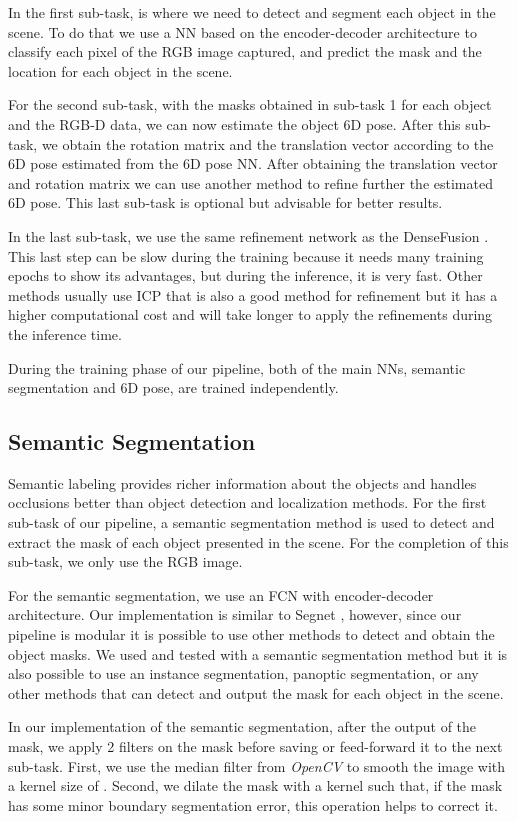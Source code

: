 \documentclass[runningheads]{llncs}
\begin{document}
In the first sub-task, is where we need to detect and segment each object in the scene. To do that we use a NN based on the encoder-decoder architecture to classify each pixel of the RGB image captured, and predict the mask and the location for each object in the scene.

For the second sub-task, with the masks obtained in sub-task 1 for each object and the RGB-D data, we can now estimate the object 6D pose.
After this sub-task, we obtain the rotation matrix and the translation vector according to the 6D pose estimated from the 6D pose NN.
After obtaining the translation vector and rotation matrix we can use another method to refine further the estimated 6D pose.
This last sub-task is optional but advisable for better results.

In the last sub-task, we use the same refinement network as the DenseFusion \cite{densefusion}.
This last step can be slow during the training because it needs many training epochs to show its advantages, but during the inference, it is very fast.
Other methods usually use ICP that is also a good method for refinement but it has a higher computational cost and will take longer to apply the refinements during the inference time.

During the training phase of our pipeline, both of the main NNs, semantic segmentation and 6D pose, are trained independently.

\subsection{Semantic Segmentation}
Semantic labeling provides richer information about the objects and handles occlusions better than object detection and localization methods.
For the first sub-task of our pipeline, a semantic segmentation method is used to detect and extract the mask of each object presented in the scene.
For the completion of this sub-task, we only use the RGB image.

For the semantic segmentation, we use an FCN with encoder-decoder architecture.
Our implementation is similar to Segnet \cite{segnet}, however, since our pipeline is modular it is possible to use other methods to detect and obtain the object masks.
We used and tested with a semantic segmentation method but it is also possible to use an instance segmentation, panoptic segmentation, or any other methods that can detect and output the mask for each object in the scene.

In our implementation of the semantic segmentation, after the output of the mask, we apply 2 filters on the mask before saving or feed-forward it to the next sub-task.
First, we use the median filter from \textit{OpenCV} to smooth the image with a kernel size of .
Second, we dilate the mask with a  kernel such that, if the mask has some minor boundary segmentation error, this operation helps to correct it.
\end{document}
